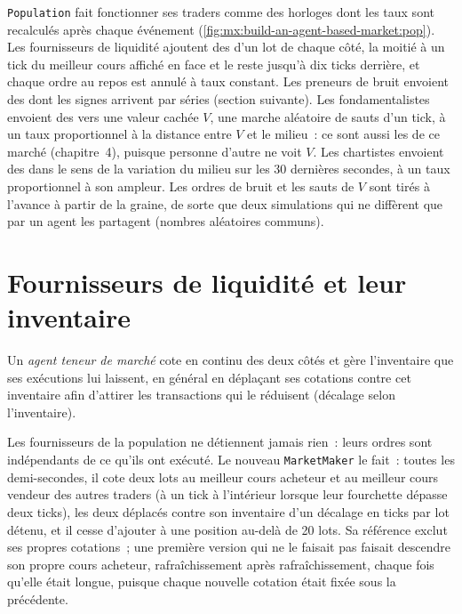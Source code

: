 \texttt{Population} fait fonctionner ses traders comme des horloges dont les taux sont recalculés après chaque événement
(\cref{fig:mx:build-an-agent-based-market:pop}). Les fournisseurs de liquidité ajoutent des  d'un lot de chaque côté, la moitié à un tick du meilleur cours affiché
en face et le reste jusqu'à dix ticks derrière, et chaque ordre au repos est annulé à taux constant. Les preneurs de bruit envoient des  dont les signes arrivent par séries
(section suivante). Les fondamentalistes envoient des  vers une valeur cachée $V$, une marche aléatoire de sauts d'un tick, à un taux proportionnel à
la distance entre $V$ et le milieu~: ce sont aussi les  de ce marché (chapitre~4), puisque personne d'autre ne voit $V$. Les chartistes envoient des 
dans le sens de la variation du milieu sur les 30 dernières secondes, à un taux proportionnel à son ampleur. Les ordres de bruit et les sauts de $V$ sont tirés
à l'avance à partir de la graine, de sorte que deux simulations qui ne diffèrent que par un agent les partagent (nombres aléatoires communs).

\label{lst:mx:build-an-agent-based-market:pop}

\section{Fournisseurs de liquidité et leur inventaire}

\begin{definition}\label{def:mx:build-an-agent-based-market:mm}
Un \emph{agent teneur de marché} cote en continu des deux côtés et gère l'inventaire que ses exécutions lui laissent, en général
en déplaçant ses cotations contre cet inventaire afin d'attirer les transactions qui le réduisent (décalage selon l'inventaire).
\end{definition}

Les fournisseurs de la population ne détiennent jamais rien~: leurs ordres sont indépendants de ce qu'ils ont exécuté. Le nouveau \texttt{MarketMaker} le fait~: toutes les
demi-secondes, il cote deux lots au meilleur cours acheteur et au meilleur cours vendeur des autres traders (à un tick à l'intérieur lorsque leur fourchette dépasse deux ticks), les deux déplacés contre son
inventaire d'un décalage en ticks par lot détenu, et il cesse d'ajouter à une position au-delà de 20 lots. Sa référence exclut ses propres cotations~; une première version
qui ne le faisait pas faisait descendre son propre cours acheteur, rafraîchissement après rafraîchissement, chaque fois qu'elle était longue, puisque chaque nouvelle cotation était fixée sous la précédente.

